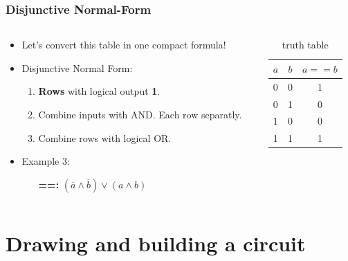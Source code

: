 \documentclass{beamer}
\begin{document}
\begin{frame}\frametitle{Disjunctive Normal-Form}
  
  \begin{columns}
  \begin{column}{6cm}
  \begin{itemize}
    \item Let's convert this table in one compact formula!
    \item Disjunctive Normal Form:
    \begin{enumerate}
     \item \textbf{Rows} with logical output \textbf{1}.
     \item Combine inputs with AND. Each row separatly.
     \item Combine rows with logical OR.
    \end{enumerate}
    \item Example 3: 
    \begin{itemize}
      \item [\textbf{==:}]$(\overline{a}\land \overline{b})\lor(a\land b)$
    \end{itemize}
  \end{itemize}
  \end{column}
  
    
  \begin{column}{6cm}
  \begin{table}[H]
  \centering
  \begin{tabular}{c|c||c}
  \textbf{$a$} & \textbf{$b$} & \textbf{$a == b$} \\ \hline
  0          & 0          & 1      \\
  0          & 1          & 0  \\
  1          & 0          & 0   \\
  1          & 1          & 1 
  \end{tabular}
  \caption{truth table}
  \label{tab:truth}
  \end{table}
  \end{column}
  
  \end{columns}  
  
  
  
\end{frame}






\section{Drawing and building a circuit}
\end{document}
